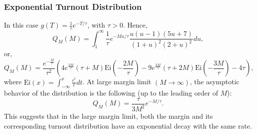 \subsubsection{Exponential Turnout Distribution}
In this case $g(T) = \frac{1}{\tau}e^{-T / \tau}$, with $ \tau> 0$. Hence,
\begin{equation}
    Q_M(M) = \int_{1}^{\infty}\frac{1}{\tau}e^{-Mu / \tau} \frac{u(u - 1)(5u + 7)}{(1 + u)^2 (2 + u)^2}du,
\end{equation}
or,
\begin{equation}
    Q_M(M) = \frac{e^{-\frac{M}{\tau}}}{\tau^2} \left(4 e^{\frac{2 M}{\tau}} (\tau+M) \text{Ei}\left(-\frac{2 M}{\tau}\right)-9 e^{\frac{3 M}{\tau}} (\tau+2 M) \text{Ei}\left(-\frac{3 M}{\tau}\right)-4 \tau\right), 
\end{equation}
where $\text{Ei}(x) = \int_{-\infty}^{x}\frac{e^t}{t}dt$. At large margin limit $(M \rightarrow \infty)$, the asymptotic behavior of the distribution is the following (up to the leading order of $M$):
\begin{equation}
    Q_M(M)= \frac{\tau}{3M^2}e^{-M/\tau}.
\end{equation}
This suggests that in the large margin limit, both the margin and its corresponding turnout distribution have an exponential decay with the same rate.

